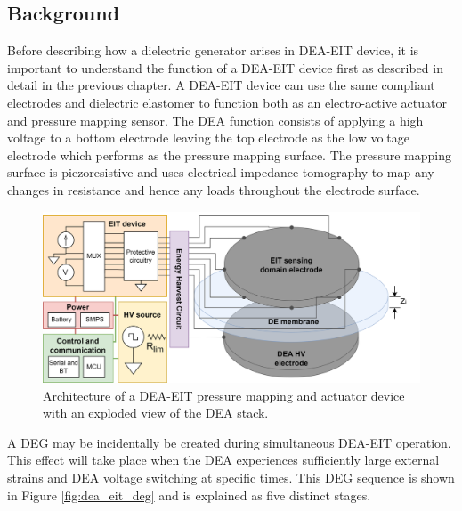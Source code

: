 \subsection{Background} 
\label{subsec:background}
Before describing how a dielectric generator arises in DEA-EIT device, it is important to understand the function of a DEA-EIT device first as  described in detail in the previous chapter. A DEA-EIT device can use the same compliant electrodes and dielectric elastomer to function both as an electro-active actuator and pressure mapping sensor. The DEA function consists of applying a high voltage to a bottom electrode leaving the top electrode as the low voltage electrode which performs as the pressure mapping surface. The pressure mapping surface is piezoresistive and uses electrical impedance tomography to map any changes in resistance and hence any loads throughout the electrode surface. 
\begin{figure}[H]
	\centering
	\hspace{1cm}
	\includegraphics[width=0.8\linewidth]{Figures/DEA-EIT_architecture_v2.png}
	\vspace{0.3cm}
	\caption{Architecture of a DEA-EIT pressure mapping and actuator device with an exploded view of the DEA stack.}
	\label{fig:dea-eit-architecture-w-MCU}
\end{figure}

A DEG may be incidentally be created during simultaneous DEA-EIT operation. This effect will take place when the DEA experiences sufficiently large external strains and DEA voltage switching at specific times. This DEG sequence is shown in Figure \ref{fig:dea_eit_deg} and is explained as five distinct stages.

